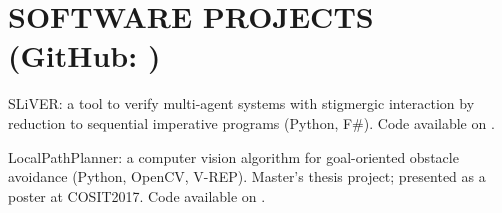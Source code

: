 \documentclass[a4paper]{deedy-resume-openfont}
\begin{document}
\begin{minipage}[t]{0.67\textwidth}
\nocite{*}

\sectionsep%

\section{SOFTWARE PROJECTS \small{(GitHub: \href{https://github.com/lou1306}{})}}
\location{\hspace{1em}}

\begin{tightemize}
\item
SLiVER\@: a tool to verify multi-agent systems with stigmergic interaction
by reduction to sequential imperative programs
(Python, F\#).
Code available on \href{https://github.com/labs-lang/sliver}{}.

\item
LocalPathPlanner: a computer vision algorithm
for goal-oriented obstacle avoidance (Python, OpenCV, V-REP).
Master's thesis project; presented as a poster at COSIT2017. 
Code available on \href{https://github.com/lou1306/localpathplanner}{}.
\end{tightemize}

\end{minipage} 
\end{document}
